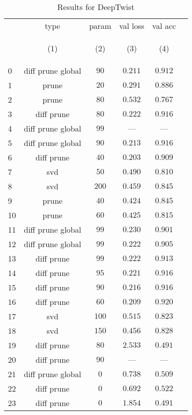 \documentclass[10pt]{article}
\begin{document}
\begin{table}[tbh]
        \caption{Results for DeepTwist}
        \label{tab:deeptwist_results}
        \centering
        \vspace{1em}
        \begin{tabular}{lccccc}
\toprule
{} &               type &  param &  val loss &   val acc \\
{} & 
\hypertarget{tabcol:1}{(1)} & \hypertarget{tabcol:2}{(2)} & \hypertarget{tabcol:3}{(3)} & \hypertarget{tabcol:4}{(4)} \\ \midrule
0  &  diff prune global &   $90$ &   $0.211$ &   $0.912$ \\
1  &              prune &   $20$ &   $0.291$ &   $0.886$ \\
2  &              prune &   $80$ &   $0.532$ &   $0.767$ \\
3  &         diff prune &   $80$ &   $0.222$ &   $0.916$ \\
4  &  diff prune global &   $99$ &       --- &       --- \\
5  &  diff prune global &   $90$ &   $0.213$ &   $0.916$ \\
6  &         diff prune &   $40$ &   $0.203$ &   $0.909$ \\
7  &                svd &   $50$ &   $0.490$ &   $0.810$ \\
8  &                svd &  $200$ &   $0.459$ &   $0.845$ \\
9  &              prune &   $40$ &   $0.424$ &   $0.845$ \\
10 &              prune &   $60$ &   $0.425$ &   $0.815$ \\
11 &  diff prune global &   $99$ &   $0.230$ &   $0.901$ \\
12 &  diff prune global &   $99$ &   $0.222$ &   $0.905$ \\
13 &         diff prune &   $99$ &   $0.222$ &   $0.913$ \\
14 &         diff prune &   $95$ &   $0.221$ &   $0.916$ \\
15 &         diff prune &   $90$ &   $0.216$ &   $0.916$ \\
16 &         diff prune &   $60$ &   $0.209$ &   $0.920$ \\
17 &                svd &  $100$ &   $0.515$ &   $0.823$ \\
18 &                svd &  $150$ &   $0.456$ &   $0.828$ \\
19 &         diff prune &   $80$ &   $2.533$ &   $0.491$ \\
20 &         diff prune &   $90$ &       --- &       --- \\
21 &  diff prune global &    $0$ &   $0.738$ &   $0.509$ \\
22 &         diff prune &    $0$ &   $0.692$ &   $0.522$ \\
23 &         diff prune &    $0$ &   $1.854$ &   $0.491$ \\
\bottomrule
\end{tabular}

\end{table}
\end{document}
